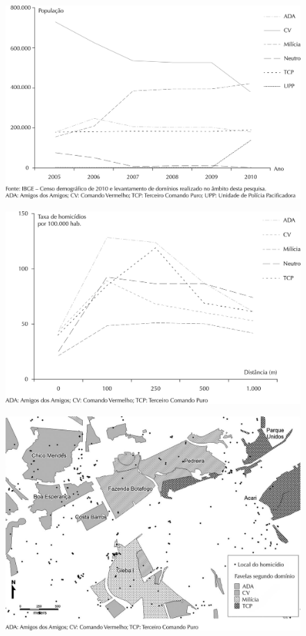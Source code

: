 \documentclass{article}
\begin{document}
\begin{figure}
\includegraphics[width=\textwidth]{0034-8910-rsp-48-01-0094-gf01}
\caption{}\label{fig:f01}
\end{figure}
\begin{figure}
\includegraphics[width=\textwidth]{0034-8910-rsp-48-01-0094-gf02}
\caption{}\label{fig:f02}
\end{figure}
\begin{figure}
\includegraphics[width=\textwidth]{0034-8910-rsp-48-01-0094-gf03}
\caption{}\label{fig:f03}
\end{figure}
\end{document}
